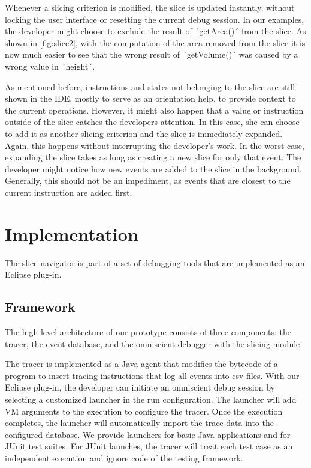 ﻿\documentclass[
      english,
      ]{llncs}
\begin{document}
Whenever a slicing criterion is modified, the slice is updated instantly, without locking the user interface or resetting the current debug session.
In our examples, the developer might choose to exclude the result of ´getArea()´ from the slice. 
As shown in \cref{fig:slice2}, with the computation of the area removed from the slice it is now much easier to see that the wrong result of ´getVolume()´ was caused by a wrong value in ´height´.


As mentioned before, instructions and states not belonging to the slice are still shown in the IDE, mostly to serve as an orientation help, to provide context to the current operations.
However, it might also happen that a value or instruction outside of the slice catches the developers attention.
In this case, she can choose to add it as another slicing criterion and the slice is immediately expanded.
Again, this happens without interrupting the developer's work.
In the worst case, expanding the slice takes as long as creating a new slice for only that event.
The developer might notice how new events are added to the slice in the background.
Generally, this should not be an impediment, as events that are closest to the current instruction are added first.

\section{Implementation}
\label{sec:impl}

The slice navigator is part of a set of debugging tools that are implemented as an Eclipse plug-in.

\subsection{Framework}

The high-level architecture of our prototype consists of three components: the tracer, the event database, and the omniscient debugger with the slicing module.

The tracer is implemented as a Java agent that modifies the bytecode of a program to insert tracing instructions that log all events into csv files.
With our Eclipse plug-in, the developer can initiate an omniscient debug session by selecting a customized launcher in the run configuration.
The launcher will add VM arguments to the execution to configure the tracer.
Once the execution completes, the launcher will automatically import the trace data into the configured database.
We provide launchers for basic Java applications and for JUnit test suites.
For JUnit launches, the tracer will treat each test case as an independent execution and ignore code of the testing framework.
\end{document}
